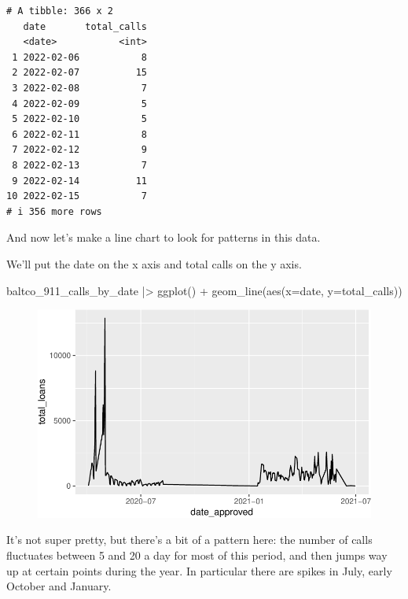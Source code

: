 \documentclass[
  letterpaper,
  DIV=11,
  numbers=noendperiod]{scrreprt}
\newenvironment{Shaded}{\begin{snugshade}}{\end{snugshade}}
\newcommand{\AttributeTok}[1]{\textcolor[rgb]{0.40,0.45,0.13}{#1}}
\newcommand{\FunctionTok}[1]{\textcolor[rgb]{0.28,0.35,0.67}{#1}}
\newcommand{\NormalTok}[1]{\textcolor[rgb]{0.00,0.23,0.31}{#1}}
\newcommand{\SpecialCharTok}[1]{\textcolor[rgb]{0.37,0.37,0.37}{#1}}
\begin{document}
\begin{verbatim}
# A tibble: 366 x 2
   date       total_calls
   <date>           <int>
 1 2022-02-06           8
 2 2022-02-07          15
 3 2022-02-08           7
 4 2022-02-09           5
 5 2022-02-10           5
 6 2022-02-11           8
 7 2022-02-12           9
 8 2022-02-13           7
 9 2022-02-14          11
10 2022-02-15           7
# i 356 more rows
\end{verbatim}

And now let's make a line chart to look for patterns in this data.

We'll put the date on the x axis and total calls on the y axis.

\begin{Shaded}
\begin{Highlighting}[]
\NormalTok{baltco\_911\_calls\_by\_date }\SpecialCharTok{|\textgreater{}}
  \FunctionTok{ggplot}\NormalTok{() }\SpecialCharTok{+} 
  \FunctionTok{geom\_line}\NormalTok{(}\FunctionTok{aes}\NormalTok{(}\AttributeTok{x=}\NormalTok{date, }\AttributeTok{y=}\NormalTok{total\_calls))}
\end{Highlighting}
\end{Shaded}

\begin{figure}[H]

{\centering \includegraphics{./visualizing-for-reporting_files/figure-pdf/unnamed-chunk-13-1.pdf}

}

\end{figure}

It's not super pretty, but there's a bit of a pattern here: the number
of calls fluctuates between 5 and 20 a day for most of this period, and
then jumps way up at certain points during the year. In particular there
are spikes in July, early October and January.
\end{document}
